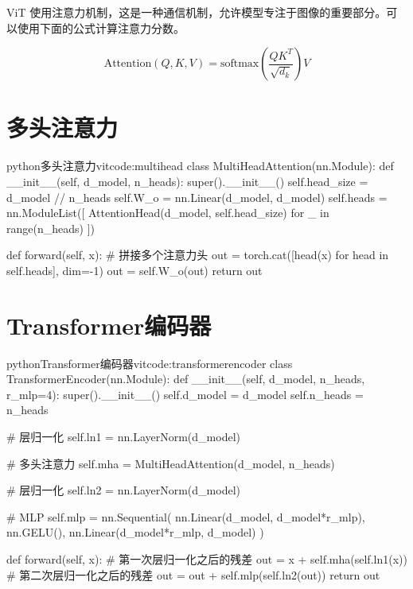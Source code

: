 \documentclass[lang=cn,newtx,10pt,scheme=chinese]{elegantbook}
\begin{document}
ViT 使用注意力机制，这是一种通信机制，允许模型专注于图像的重要部分。可以使用下面的公式计算注意力分数。

\begin{equation}\label{eq:attention-formula}
\text{Attention}(Q,K,V)=\text{softmax}\left({\frac{QK^T}{\sqrt{d_k}}}\right)V
\end{equation}

\section{多头注意力}

\begin{codebox}{python}{多头注意力}{vitcode:multihead}
class MultiHeadAttention(nn.Module):
    def __init__(self, d_model, n_heads):
        super().__init__()
        self.head_size = d_model // n_heads
        self.W_o = nn.Linear(d_model, d_model)
        self.heads = nn.ModuleList([
            AttentionHead(d_model, self.head_size) for _ in range(n_heads)
        ])

    def forward(self, x):
        # 拼接多个注意力头
        out = torch.cat([head(x) for head in self.heads], dim=-1)
        out = self.W_o(out)
        return out
\end{codebox}

\section{Transformer编码器}

\begin{codebox}{python}{Transformer编码器}{vitcode:transformerencoder}
class TransformerEncoder(nn.Module):
    def __init__(self, d_model, n_heads, r_mlp=4):
        super().__init__()
        self.d_model = d_model
        self.n_heads = n_heads

        # 层归一化
        self.ln1 = nn.LayerNorm(d_model)

        # 多头注意力
        self.mha = MultiHeadAttention(d_model, n_heads)

        # 层归一化
        self.ln2 = nn.LayerNorm(d_model)

        # MLP
        self.mlp = nn.Sequential(
            nn.Linear(d_model, d_model*r_mlp),
            nn.GELU(),
            nn.Linear(d_model*r_mlp, d_model)
        )

    def forward(self, x):
        # 第一次层归一化之后的残差
        out = x + self.mha(self.ln1(x))
        # 第二次层归一化之后的残差
        out = out + self.mlp(self.ln2(out))
        return out
\end{codebox}
\end{document}
